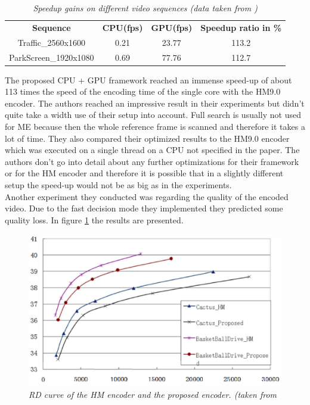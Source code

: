 \begin{table}[ht]
  \centering
  \begin{tabular}{cccc}
    \textbf{Sequence} & \textbf{CPU(fps)} & \textbf{GPU(fps)} & \textbf{Speedup ratio in \%} \\
    Traffic\_2560x1600 & 0.21 & 23.77 & 113.2\\
    ParkScreen\_1920x1080 & 0.69 & 77.76 & 112.7\\
 \end{tabular}
 \caption{ \label{hevc_table_result}{\it Speedup gains on different video sequences (data taken from \cite{Paper3})}}
\end{table}

The proposed CPU + GPU framework reached an immense speed-up of about 113 times the speed of the encoding time of the single core with the HM9.0 encoder. The authors reached an impressive result in their experiments but didn't quite take a width use of their setup into account. Full search is usually not used for ME because then the whole reference frame is scanned and therefore it takes a lot of time. They also compared their optimized results to the HM9.0 encoder which was executed on a single thread on a CPU not specified in the paper. The authors don't go into detail about any further optimizations for their framework or for the HM encoder and therefore it is possible that in a slightly different setup the speed-up would not be as big as in the experiments. \\
Another experiment they conducted was regarding the quality of the encoded video. Due to the fast decision mode they implemented they predicted some quality loss. In figure \ref{hevc_rd_result} the results are presented.\\

\begin{figure}[H]
\centerline{\includegraphics[scale=0.3]{pics/hevc_rd_result}} %

\caption{\label{hevc_rd_result}{\it RD curve of the HM encoder and the proposed encoder. (taken from \cite{Paper3}}}
\end{figure}

